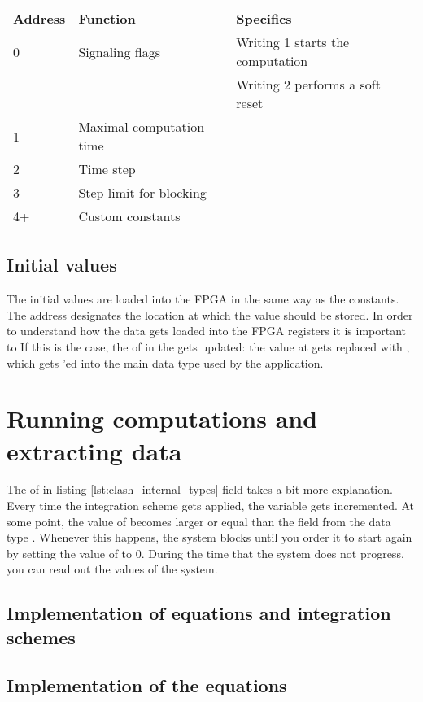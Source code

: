 \begin{tabular}{l l l}
	\label{t:control_protocol}
	\textbf{Address} & \textbf{Function} &  \textbf{Specifics} \\
	0 	& Signaling flags 			& Writing 1 starts the computation \\
	& 				 				& Writing 2 performs a soft reset \\
	1 	& Maximal computation time 	& \\
	2 	& Time step 				& \\
	3 	& Step limit for blocking	& \\ 
	4+ 	& Custom constants 			& \\
\end{tabular}

\subsection{Initial values}
The initial values are loaded into the FPGA in the same way as the constants. The address designates the location at which the value should be stored. 
In order to understand how the data gets loaded into the FPGA registers it is important to  If this is the case, the  of  in the  gets updated: the value at  gets replaced with , which gets 'ed into the main data type used by the application. 





\section{Running computations and extracting data}
\label{s:compute}
The  of  in listing \ref{lst:clash_internal_types} field takes a bit more explanation. Every time the integration scheme gets applied, the  variable gets incremented. At some point, the value of  becomes larger or equal than the  field from the data type . Whenever this happens, the system blocks until you order it to start again by setting the value of  to 0. During the time that the system does not progress, you can read out the values of the system.




\subsection{Implementation of equations and integration schemes}

\subsection{Implementation of the equations}





